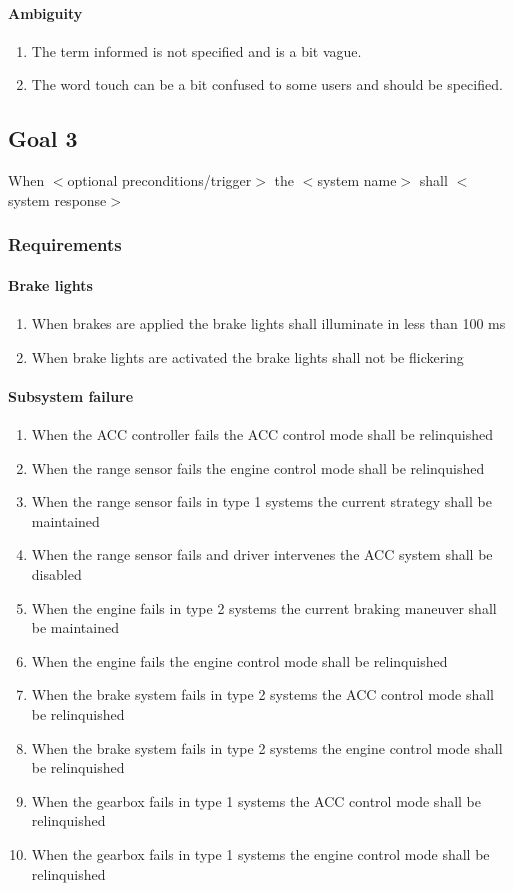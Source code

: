 \paragraph{Ambiguity}
\begin{enumerate}
    \item The term informed is not specified and is a bit vague.
    \item The word touch can be a bit confused to some users and should be specified.
\end{enumerate}

\newpage

\subsection{Goal 3}
When $<$optional preconditions/trigger$>$ the $<$system name$>$ shall $<$system response$>$

\subsubsection{Requirements}
\paragraph{Brake lights}
\begin{enumerate}
    \item{When brakes are applied the brake lights shall illuminate in less than 100 ms}
    \item{When brake lights are activated the brake lights shall not be flickering}
\end{enumerate}

\paragraph{Subsystem failure}
\begin{enumerate}
    \item{When the ACC controller fails the ACC control mode shall be relinquished}
    \item{When the range sensor fails the engine control mode shall be relinquished}
    \item{When the range sensor fails in type 1 systems the current strategy shall be maintained}
    \item{When the range sensor fails and driver intervenes the ACC system shall be disabled}
    \item{When the engine fails in type 2 systems the current braking maneuver shall be maintained}
    \item{When the engine fails the engine control mode shall be relinquished}
    \item{When the brake system fails in type 2 systems the ACC control mode shall be relinquished}
    \item{When the brake system fails in type 2 systems the engine control mode shall be relinquished}
    \item{When the gearbox fails in type 1 systems the ACC control mode shall be relinquished}
    \item{When the gearbox fails in type 1 systems the engine control mode shall be relinquished}
\end{enumerate}

